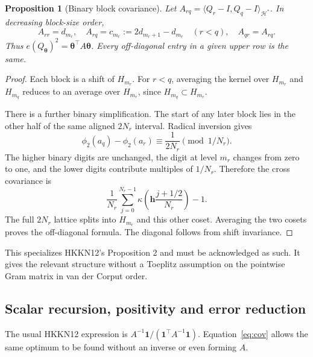 \documentclass[11pt]{article}
\newtheorem{proposition}{Proposition}
\newcommand{\bbone}{\boldsymbol{1}}
\newcommand{\btheta}{\boldsymbol{\theta}}
\newcommand{\bh}{\boldsymbol{h}}
\newcommand{\cH}{\mathcal H}
\begin{document}
\begin{proposition}[Binary block covariance]\label{prop:cov}
Let $A_{rq}=\langle Q_r-I,Q_q-I\rangle_{\cH^*}$.
In decreasing block-size order,
\begin{equation}\label{eq:cov}
 A_{rr}=d_{m_r},\quad
 A_{rq}=c_{m_r}:=2d_{m_r+1}-d_{m_r}\quad(r<q),\quad A_{qr}=A_{rq}.
\end{equation}
Thus $e(Q_{\btheta})^2=\btheta^\top A\btheta$.
Every off-diagonal entry in a given upper row is the same.
\end{proposition}
\begin{proof}
Each block is a shift of $H_{m_r}$. For $r<q$, averaging the kernel over
$H_{m_r}$ and $H_{m_q}$ reduces to an average over $H_{m_r}$,
since $H_{m_q}\subset H_{m_r}$.

There is a further binary simplification. The start of any later block
lies in the other half of the same aligned $2N_r$ interval.
Radical inversion gives
\[
 \phi_2(a_q)-\phi_2(a_r)
 \equiv\frac1{2N_r}\pmod{1/N_r}.
\]
The higher binary digits are unchanged, the digit at level $m_r$
changes from zero to one, and the lower digits contribute multiples
of $1/N_r$. Therefore the cross covariance is
\[
 \frac1{N_r}\sum_{j=0}^{N_r-1}
 \kappa\!\left(\bh\frac{j+1/2}{N_r}\right)-1.
\]
The full $2N_r$ lattice splits into $H_{m_r}$ and this other coset.
Averaging the two cosets proves the off-diagonal formula.
The diagonal follows from shift invariance.
\end{proof}
This specializes HKKN12's Proposition 2 and must be acknowledged as
such. It gives the relevant structure without a Toeplitz assumption on
the pointwise Gram matrix in van der Corput order.

\subsection{Scalar recursion, positivity and error reduction}
The usual HKKN12 expression is
$A^{-1}\bbone/(\bbone^\top A^{-1}\bbone)$.
Equation~\eqref{eq:cov} allows the same optimum to be found without
an inverse or even forming $A$.
\end{document}

